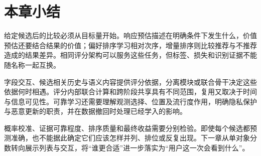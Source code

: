 \section{本章小结}
\label{sec:rs-ranking-summary}

给定候选后的比较必须从目标量开始。响应预估描述在明确条件下发生什么，价值预估还要结合结果的价值；偏好排序学习相对次序，增量排序则比较推荐与不推荐造成的结果差异。相同评分架构可以服务这些任务，但标签、损失和识别证据不能随名称一起互换。

字段交互、候选相关历史与语义内容提供评分依据，分离模块或联合骨干决定这些依据何时相遇。评分内部联合计算和跨阶段共享具有不同范围，复用又取决于时间与信息可见性。可靠学习还需要理解观测选择、位置及流行度作用，明确隐私保护与恶意更新的职责，并在数据撤回时处理已经学入的影响。

概率校准、证据可靠程度、排序质量和最终收益需要分别检验。即使每个候选都预测准确，也不能据此确定它们应该怎样并列、排位或反复出现。下一章从单对象分数转向展示列表与交互，将“谁更合适”进一步落实为“用户这一次会看到什么”。
